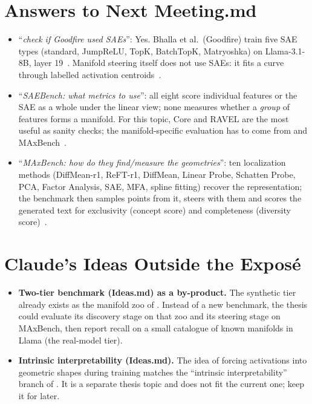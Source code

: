 \documentclass[11pt,a4paper]{article}
\newcommand{\note}[1]{\textsf{#1}}                 %
\newcommand{\claim}[1]{\enquote{\textit{#1}}}       %
\begin{document}
\section{Answers to Next Meeting.md}\label{sec:meeting}
\begin{itemize}
  \item \claim{check if Goodfire used SAEs}: Yes. Bhalla et al.\ (Goodfire)
    train five SAE types (standard, JumpReLU, TopK, BatchTopK, Matryoshka)
    on Llama-3.1-8B, layer 19~\cite{bhalla2026saemanifolds}. Manifold
    steering itself does not use SAEs: it fits a curve through labelled
    activation centroids~\cite{wurgaft2026manifoldsteering}.
  \item \claim{SAEBench: what metrics to use}: all eight score individual
    features or the SAE as a whole under the linear view; none measures
    whether a \emph{group} of features forms a manifold. For this topic,
    Core and RAVEL are the most useful as sanity checks; the
    manifold-specific evaluation has to come from
    \textcite{bhalla2026saemanifolds} and MAxBench~\cite{karvonen2025saebench,appapogu2026maxbench}.
  \item \claim{MAxBench: how do they find/measure the geometries}: ten
    localization methods (DiffMean-r1, ReFT-r1, DiffMean, Linear Probe,
    Schatten Probe, PCA, Factor Analysis, SAE, MFA, spline fitting) recover
    the representation; the benchmark then samples points from it, steers
    with them and scores the generated text for exclusivity (concept
    score) and completeness (diversity score)~\cite{appapogu2026maxbench}.
\end{itemize}

\section{Claude's Ideas Outside the Exposé}\label{sec:ideas}
\begin{itemize}
  \item \textbf{Two-tier benchmark (\note{Ideas.md}) as a by-product.} The
    synthetic tier already exists as the manifold zoo of
    \textcite{bhalla2026saemanifolds}. Instead of a new benchmark, the
    thesis could evaluate its discovery stage on that zoo and its steering
    stage on MAxBench, then report recall on a small catalogue of known
    manifolds in Llama (the real-model tier).
  \item \textbf{Intrinsic interpretability (\note{Ideas.md}).} The idea of
    forcing activations into geometric shapes during training matches the
    \enquote{intrinsic interpretability} branch of
    \textcite{bereska2024review}. It is a separate thesis topic and does
    not fit the current one; keep it for later.
\end{itemize}

\printbibliography[heading=bibintoc,title={References}]
\end{document}

